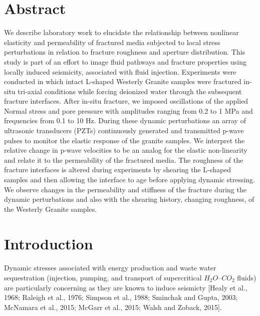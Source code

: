 \documentclass[letterpaper,10pt]{article}
\begin{document}
\section{Abstract}
We describe laboratory work to elucidate the relationship between nonlinear elasticity and
permeability of fractured media subjected to local stress perturbations in relation to fracture
roughness and aperture distribution. This study is part of an effort to image fluid pathways and
fracture properties using locally induced seismicity, associated with fluid injection. Experiments were conducted in which intact L-shaped Westerly Granite samples were fractured in-situ tri-axial conditions while forcing deionized water through the subsequent fracture interfaces. After in-situ fracture, we imposed oscillations of the applied Normal stress and pore pressure with amplitudes ranging from 0.2 to 1 MPa and frequencies from 0.1 to 10 Hz. During these dynamic perturbations an array of ultrasonic transducers (PZTs) continuously generated and transmitted p-wave pulses to monitor the elastic response of the granite samples. We interpret the relative change in p-wave velocities to be an analog for the elastic non-linearity and relate it to the permeability of the fractured media. The roughness of the fracture interfaces is altered during experiments by shearing the L-shaped samples and then allowing the interface to age before applying dynamic stressing. We observe changes in the permeability and stiffness of the fracture during the dynamic perturbations and also with the shearing history, changing roughness, of the Westerly Granite samples.

\section{Introduction}

\paragraph{} Dynamic stresses associated with energy production and waste water sequestration (injection, pumping, and transport of supercritical $H_{2}O$--$CO_{2}$ fluids) are particularly concerning as they are known to induce seismicty [Healy et al., 1968; Raleigh et al., 1976; Simpson et al., 1988; Sminchak and Gupta, 2003; McNamara et al., 2015; McGarr et al., 2015; Walsh and Zoback, 2015]. 
\end{document}
